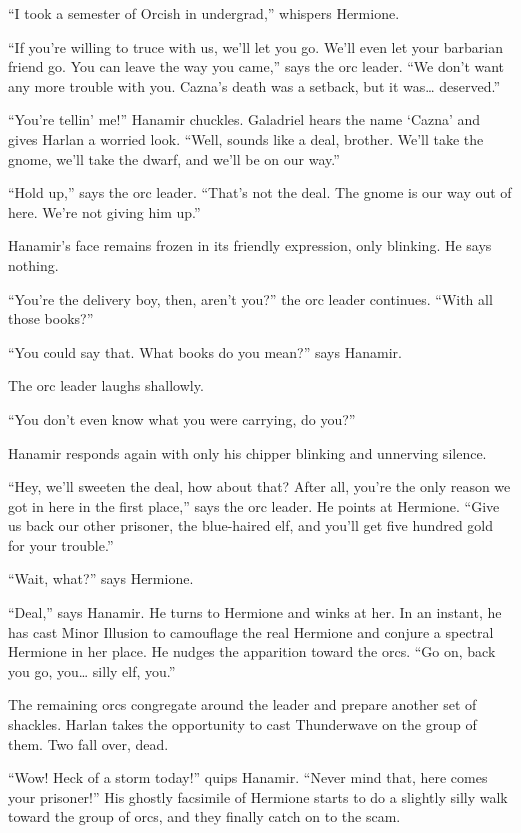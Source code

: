 \documentclass[smalldemyvopaper,11pt,twoside,onecolumn,openright,extrafontsizes]{memoir}
\begin{document}
``I took a semester of Orcish in undergrad,'' whispers Hermione.

``If you're willing to truce with us, we'll let you go. We'll even let
your barbarian friend go. You can leave the way you came,'' says the orc
leader. ``We don't want any more trouble with you. Cazna's death was a
setback, but it was\ldots{} deserved.''

``You're tellin' me!'' Hanamir chuckles. Galadriel hears the name
`Cazna' and gives Harlan a worried look. ``Well, sounds like a deal,
brother. We'll take the gnome, we'll take the dwarf, and we'll be on our
way.''

``Hold up,'' says the orc leader. ``That's not the deal. The gnome is
our way out of here. We're not giving him up.''

Hanamir's face remains frozen in its friendly expression, only blinking.
He says nothing.

``You're the delivery boy, then, aren't you?'' the orc leader continues.
``With all those books?''

``You could say that. What books do you mean?'' says Hanamir.

The orc leader laughs shallowly.

``You don't even know what you were carrying, do you?''

Hanamir responds again with only his chipper blinking and unnerving
silence.

``Hey, we'll sweeten the deal, how about that? After all, you're the
only reason we got in here in the first place,'' says the orc leader. He
points at Hermione. ``Give us back our other prisoner, the blue-haired
elf, and you'll get five hundred gold for your trouble.''

``Wait, what?'' says Hermione.

``Deal,'' says Hanamir. He turns to Hermione and winks at her. In an
instant, he has cast Minor Illusion to camouflage the real Hermione and
conjure a spectral Hermione in her place. He nudges the apparition
toward the orcs. ``Go on, back you go, you\ldots{} silly elf, you.''

The remaining orcs congregate around the leader and prepare another set
of shackles. Harlan takes the opportunity to cast Thunderwave on the
group of them. Two fall over, dead.

``Wow! Heck of a storm today!'' quips Hanamir. ``Never mind that, here
comes your prisoner!'' His ghostly facsimile of Hermione starts to do a
slightly silly walk toward the group of orcs, and they finally catch on
to the scam.
\end{document}
